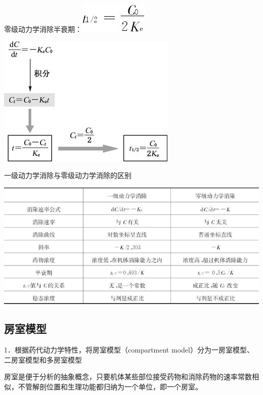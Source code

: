 零级动力学消除半衰期：\includegraphics{./images/Image00053.jpg}

\includegraphics{./images/Image00054.jpg}

\begin{table}[htbp]
\centering
\caption{一级动力学消除与零级动力学消除的区别}
\label{tab3-5}
\includegraphics{./images/Image00055.jpg}
\end{table}

\subsection{房室模型}

1．根据药代动力学特性，将房室模型（compartment
model）分为一房室模型、二房室模型和多房室模型

房室是便于分析的抽象概念，只要机体某些部位接受药物和消除药物的速率常数相似，不管解剖位置和生理功能都归纳为一个单位，即一个房室。

